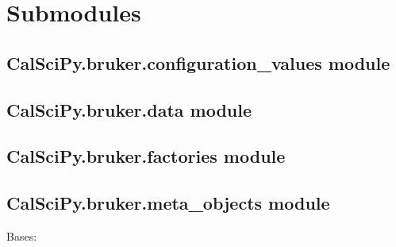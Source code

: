 \documentclass[letterpaper,10pt,english]{sphinxmanual}
\begin{document}
\section{Submodules}
\label{\detokenize{CalSciPy.bruker:submodules}}
\sphinxstepscope


\subsection{CalSciPy.bruker.configuration\_values module}
\label{\detokenize{CalSciPy.bruker.configuration_values:calscipy-bruker-configuration-values-module}}\label{\detokenize{CalSciPy.bruker.configuration_values::doc}}
\sphinxstepscope


\subsection{CalSciPy.bruker.data module}
\label{\detokenize{CalSciPy.bruker.data:calscipy-bruker-data-module}}\label{\detokenize{CalSciPy.bruker.data::doc}}
\sphinxstepscope


\subsection{CalSciPy.bruker.factories module}
\label{\detokenize{CalSciPy.bruker.factories:calscipy-bruker-factories-module}}\label{\detokenize{CalSciPy.bruker.factories::doc}}
\sphinxstepscope


\subsection{CalSciPy.bruker.meta\_objects module}
\label{\detokenize{CalSciPy.bruker.meta_objects:module-CalSciPy.bruker.meta_objects}}\label{\detokenize{CalSciPy.bruker.meta_objects:calscipy-bruker-meta-objects-module}}\label{\detokenize{CalSciPy.bruker.meta_objects::doc}}

\begin{fulllineitems}
\label{\detokenize{CalSciPy.bruker.meta_objects:CalSciPy.bruker.meta_objects.GroupMeta}}
\pysigstartsignatures
{}
\pysigstopsignatures
\sphinxAtStartPar
Bases: 

\end{fulllineitems}
\end{document}
